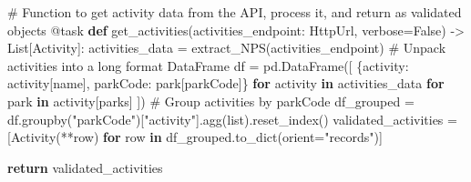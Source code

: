 \documentclass[
  letterpaper,
  DIV=11,
  numbers=noendperiod]{scrartcl}
\newenvironment{Shaded}{\begin{snugshade}}{\end{snugshade}}
\newcommand{\AttributeTok}[1]{\textcolor[rgb]{0.40,0.45,0.13}{#1}}
\newcommand{\BuiltInTok}[1]{\textcolor[rgb]{0.00,0.23,0.31}{#1}}
\newcommand{\CommentTok}[1]{\textcolor[rgb]{0.37,0.37,0.37}{#1}}
\newcommand{\ControlFlowTok}[1]{\textcolor[rgb]{0.00,0.23,0.31}{\textbf{#1}}}
\newcommand{\KeywordTok}[1]{\textcolor[rgb]{0.00,0.23,0.31}{\textbf{#1}}}
\newcommand{\NormalTok}[1]{\textcolor[rgb]{0.00,0.23,0.31}{#1}}
\newcommand{\OperatorTok}[1]{\textcolor[rgb]{0.37,0.37,0.37}{#1}}
\newcommand{\StringTok}[1]{\textcolor[rgb]{0.13,0.47,0.30}{#1}}
\newcommand{\VariableTok}[1]{\textcolor[rgb]{0.07,0.07,0.07}{#1}}
\begin{document}
\begin{Shaded}
\begin{Highlighting}[]
\CommentTok{\# Function to get activity data from the API, process it, and return as validated objects}
\AttributeTok{@task}
\KeywordTok{def}\NormalTok{ get\_activities(activities\_endpoint: HttpUrl, verbose}\OperatorTok{=}\VariableTok{False}\NormalTok{) }\OperatorTok{{-}\textgreater{}}\NormalTok{ List[Activity]:}
\NormalTok{    activities\_data }\OperatorTok{=}\NormalTok{ extract\_NPS(activities\_endpoint)}
    \CommentTok{\# Unpack activities into a long format DataFrame}
\NormalTok{    df }\OperatorTok{=}\NormalTok{ pd.DataFrame([}
\NormalTok{        \{}\StringTok{\textquotesingle{}activity\textquotesingle{}}\NormalTok{: activity[}\StringTok{\textquotesingle{}name\textquotesingle{}}\NormalTok{], }\StringTok{\textquotesingle{}parkCode\textquotesingle{}}\NormalTok{: park[}\StringTok{\textquotesingle{}parkCode\textquotesingle{}}\NormalTok{]\}}
        \ControlFlowTok{for}\NormalTok{ activity }\KeywordTok{in}\NormalTok{ activities\_data}
        \ControlFlowTok{for}\NormalTok{ park }\KeywordTok{in}\NormalTok{ activity[}\StringTok{\textquotesingle{}parks\textquotesingle{}}\NormalTok{]}
\NormalTok{    ])}
    \CommentTok{\# Group activities by parkCode}
\NormalTok{    df\_grouped }\OperatorTok{=}\NormalTok{ df.groupby(}\StringTok{"parkCode"}\NormalTok{)[}\StringTok{"activity"}\NormalTok{].agg(}\BuiltInTok{list}\NormalTok{).reset\_index()}
\NormalTok{    validated\_activities }\OperatorTok{=}\NormalTok{ [Activity(}\OperatorTok{**}\NormalTok{row) }\ControlFlowTok{for}\NormalTok{ row }\KeywordTok{in}\NormalTok{ df\_grouped.to\_dict(orient}\OperatorTok{=}\StringTok{"records"}\NormalTok{)]}

    \ControlFlowTok{return}\NormalTok{ validated\_activities}


\end{Highlighting}
\end{Shaded}
\end{document}
